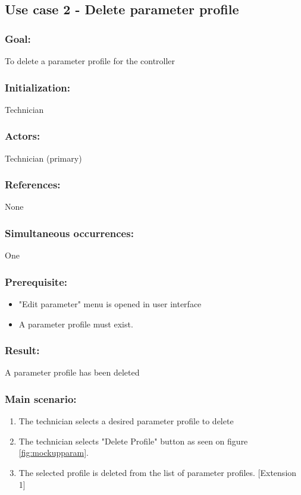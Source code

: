 \begin{framed}
	\subsection{Use case 2 - Delete parameter profile}
	\subsubsection*{Goal:}
	To delete a parameter profile for the controller
	
	\subsubsection*{Initialization:}
	Technician
	
	\subsubsection*{Actors:}
	Technician (primary)
	
	\subsubsection*{References:}
	None
	
	\subsubsection*{Simultaneous occurrences:}
	One
	
	\subsubsection*{Prerequisite:}
	\begin{itemize}
		\item "Edit parameter" menu is opened in user interface
		\item A parameter profile must exist.
	\end{itemize}
	
	\subsubsection*{Result:}
	A parameter profile has been deleted
	
	\subsubsection*{Main scenario:}
	\begin{enumerate}
		\item The technician selects a desired parameter profile to delete
		\item The technician selects "Delete Profile" button as seen on figure \ref{fig:mockupparam}.
		\item The selected profile is deleted from the list of parameter profiles. [Extension 1]
	\end{enumerate}	
	

\end{framed}
